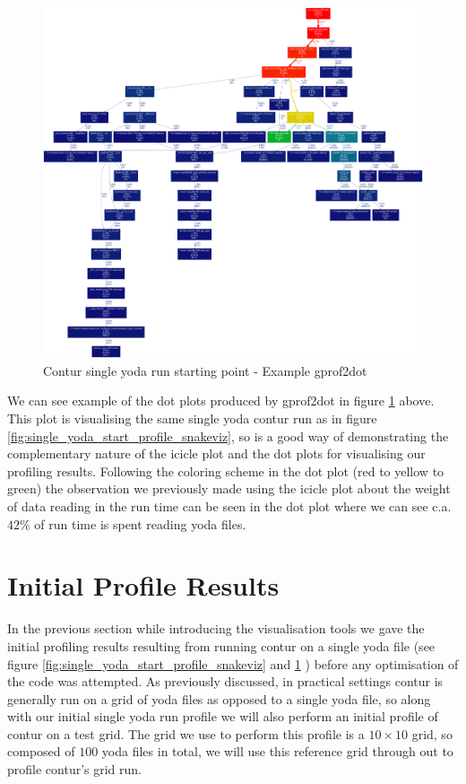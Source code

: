 \begin{figure}[H]
\centering
\includegraphics[scale=0.2]{plots/initial_contur_single_yoda.png}
\caption{Contur single yoda run starting point - Example gprof2dot}
\label{fig:single_yoda_start_profile_gprof2dot}
\end{figure}

We can see example of the dot plots produced by gprof2dot in figure \ref{fig:single_yoda_start_profile_gprof2dot} above. This plot is visualising the same single yoda contur run as in figure \ref{fig:single_yoda_start_profile_snakeviz}, so is a good way of demonstrating the complementary nature of the icicle plot and the dot plots for visualising our profiling results. Following the coloring scheme in the dot plot (red to yellow to green) the observation we previously made using the icicle plot about the weight of data reading in the run time can be seen in the dot plot where we can see c.a. $42\%$ of run time is spent reading yoda files.

\section{Initial Profile Results}
In the previous section while introducing the visualisation tools we gave the initial profiling results resulting from running contur on a single yoda file (see figure \ref{fig:single_yoda_start_profile_snakeviz} and \ref{fig:single_yoda_start_profile_gprof2dot} ) before any optimisation of the code was attempted. As previously discussed, in practical settings contur is generally run on a grid of yoda files as opposed to a single yoda file, so along with our initial single yoda run profile we will also perform an initial profile of contur on a test grid. The grid we use to perform this profile is a $10 \times 10 $ grid, so composed of $100$ yoda files in total, we will use this reference grid through out to profile contur's grid run.

